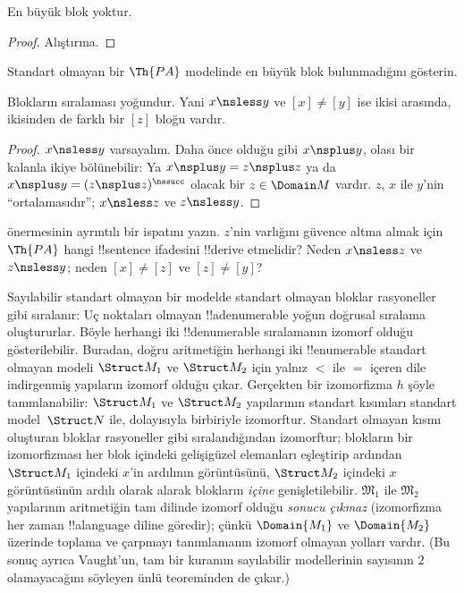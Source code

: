 \begin{prop}
En büyük blok yoktur.
\end{prop}

\begin{proof}
Alıştırma.
\end{proof}

\begin{prob}
Standart olmayan bir $\Th{PA}$ modelinde en büyük blok bulunmadığını
gösterin.
\end{prob}

\begin{prop}
Blokların sıralaması yoğundur. Yani $x\nsless y$ ve $[x]\neq[y]$ ise
ikisi arasında, ikisinden de farklı bir $[z]$ bloğu vardır.
\end{prop}

\begin{proof}
$x\nsless y$ varsayalım. Daha önce olduğu gibi $x\nsplus y$, olası bir
kalanla ikiye bölünebilir: Ya $x\nsplus y=z\nsplus z$ ya da
$x\nsplus y=(z\nsplus z)^\nssucc$ olacak bir $z\in\Domain M$ vardır.
$z$, $x$ ile $y$'nin ``ortalamasıdır''; $x\nsless z$ ve
$z\nsless y$.
\end{proof}

\begin{prob}
 önermesinin ayrıntılı bir
ispatını yazın. $z$'nin varlığını güvence altına almak için $\Th{PA}$
hangi !!{sentence} ifadesini !!{derive} etmelidir? Neden
$x\nsless z$ ve $z\nsless y$; neden $[x]\neq[z]$ ve $[z]\neq[y]$?
\end{prob}

\begin{explain}
Sayılabilir standart olmayan bir modelde standart olmayan bloklar
rasyoneller gibi sıralanır: Uç noktaları olmayan !!a{denumerable}
yoğun doğrusal sıralama oluştururlar. Böyle herhangi iki
!!{denumerable} sıralamanın izomorf olduğu gösterilebilir. Buradan,
doğru aritmetiğin herhangi iki !!{enumerable} standart olmayan modeli
$\Struct M_1$ ve $\Struct M_2$ için yalnız $<$ ile $=$ içeren dile
indirgenmiş yapıların izomorf olduğu çıkar. Gerçekten bir izomorfizma
$h$ şöyle tanımlanabilir: $\Struct M_1$ ve $\Struct M_2$ yapılarının
standart kısımları standart model~$\Struct N$ ile, dolayısıyla
birbiriyle izomorftur. Standart olmayan kısmı oluşturan bloklar
rasyoneller gibi sıralandığından izomorftur; blokların bir izomorfizması
her blok içindeki gelişigüzel elemanları eşleştirip ardından
$\Struct M_1$ içindeki $x$'in ardılının görüntüsünü, $\Struct M_2$
içindeki $x$ görüntüsünün ardılı olarak alarak blokların \emph{içine}
genişletilebilir. $\mathfrak M_1$ ile $\mathfrak M_2$ yapılarının
aritmetiğin tam dilinde izomorf olduğu \emph{sonucu çıkmaz} (izomorfizma
her zaman !!a{language} diline göredir); çünkü $\Domain{M_1}$ ve
$\Domain{M_2}$ üzerinde toplama ve çarpmayı tanımlamanın izomorf olmayan
yolları vardır. (Bu sonuç ayrıca Vaught'un, tam bir kuramın sayılabilir
modellerinin sayısının $2$ olamayacağını söyleyen ünlü teoreminden de
çıkar.)
\end{explain}
